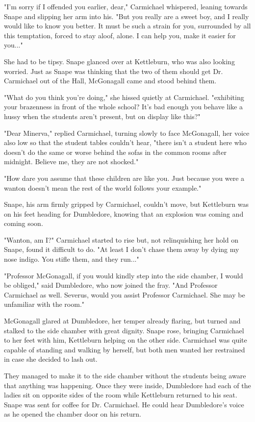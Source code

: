 \documentclass[a4paper,11pt]{article}
\begin{document}
"I'm sorry if I offended you earlier, dear," Carmichael whispered, leaning towards Snape and slipping her arm into his. "But you really are a sweet boy, and I really would like to know you better. It must be such a strain for you, surrounded by all this temptation, forced to stay aloof, alone. I can help you, make it easier for you..."

She had to be tipsy. Snape glanced over at Kettleburn, who was also looking worried. Just as Snape was thinking that the two of them should get Dr. Carmichael out of the Hall, McGonagall came and stood behind them.

"What do you think you're doing," she hissed quietly at Carmichael. "exhibiting your brazenness in front of the whole school? It's bad enough you behave like a hussy when the students aren't present, but on display like this?"

"Dear Minerva," replied Carmichael, turning slowly to face McGonagall, her voice also low so that the student tables couldn't hear, "there isn't a student here who doesn't do the same or worse behind the sofas in the common rooms after midnight. Believe me, they are not shocked."

"How dare you assume that these children are like you. Just because you were a wanton doesn't mean the rest of the world follows your example."

Snape, his arm firmly gripped by Carmichael, couldn't move, but Kettleburn was on his feet heading for Dumbledore, knowing that an explosion was coming and coming soon.

"Wanton, am I?" Carmichael started to rise but, not relinquishing her hold on Snape, found it difficult to do. "At least I don't chase them away by dying my nose indigo. You stifle them, and they run..."

"Professor McGonagall, if you would kindly step into the side chamber, I would be obliged," said Dumbledore, who now joined the fray. "And Professor Carmichael as well. Severus, would you assist Professor Carmichael. She may be unfamiliar with the room."

McGonagall glared at Dumbledore, her temper already flaring, but turned and stalked to the side chamber with great dignity. Snape rose, bringing Carmichael to her feet with him, Kettleburn helping on the other side. Carmichael was quite capable of standing and walking by herself, but both men wanted her restrained in case she decided to lash out.

They managed to make it to the side chamber without the students being aware that anything was happening. Once they were inside, Dumbledore had each of the ladies sit on opposite sides of the room while Kettleburn returned to his seat. Snape was sent for coffee for Dr. Carmichael. He could hear Dumbledore's voice as he opened the chamber door on his return.
\end{document}
